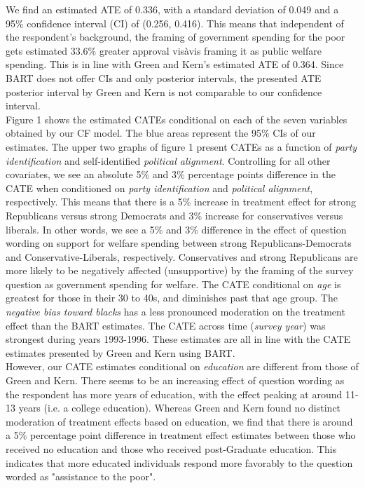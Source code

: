 \documentclass[12pt]{article}
\begin{document}
We find an estimated ATE of 0.336, with a standard deviation of 0.049 and a 95\%
confidence interval (CI) of (0.256, 0.416). This means that independent of the respondent's background, the framing of government spending for the poor gets estimated 33.6\% greater approval vis\-à\-vis framing it as public welfare spending. This is in line with Green and
Kern's estimated ATE of 0.364. Since BART does not offer CIs and only posterior
intervals, the presented ATE posterior interval by Green and Kern is not
comparable to our confidence interval. 
\\

Figure 1 shows the estimated CATEs conditional on each of the seven variables
obtained by our CF model. The blue areas represent the 95\% CIs of our
estimates. 
The upper two graphs of figure 1 present CATEs as a function of \textit{party
identification} and self-identified \textit{political alignment}. Controlling
for all other covariates, we see an absolute 5\% and 3\% percentage points
difference in the CATE when conditioned on \textit{party identification} and
\textit{political alignment}, respectively. This means that there is a 5\%
increase in treatment effect for strong Republicans versus strong Democrats and
3\% increase for conservatives versus liberals. In other words, we see a 5\% and
3\% difference in the effect of question wording on support for welfare spending
between strong Republicans-Democrats and Conservative-Liberals, respectively.
Conservatives and strong Republicans are more likely to be negatively affected
(unsupportive) by the framing of the survey question as government spending for
welfare. The CATE conditional on \textit{age} is greatest for those in their 30
to 40s, and diminishes past that age group. The \textit{negative bias toward
blacks} has a less pronounced moderation on the treatment effect than the BART
estimates. The CATE across time (\textit{survey year}) was strongest during
years 1993-1996. These estimates are all in line with the CATE estimates
presented by Green and Kern using BART. \\

However, our CATE estimates conditional on \textit{education} are different from
those of Green and Kern. There seems to be an increasing effect of question
wording as the respondent has more years of education, with the effect peaking
at around 11-13 years (i.e. a college education). Whereas Green and Kern found
no distinct moderation of treatment effects based on education, we find that
there is around a 5\% percentage point difference in treatment effect estimates
between those who received no education and those who received post-Graduate
education. This indicates that more educated individuals respond more favorably
to the question worded as "assistance to the poor". \\
\end{document}
